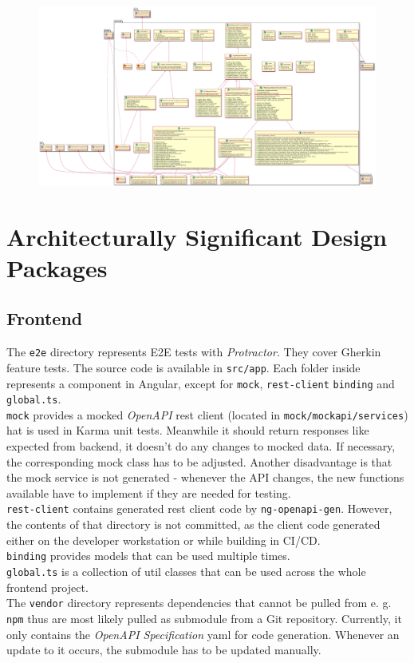 \documentclass[a4paper,12pt,chapterprefix=false,bibliography=totoc,listof=totoc,]{scrreprt}
\begin{document}
\begin{figure}
	\includegraphics[width=\textwidth]{diagramms/BackendOverview.png}
	\label{fig:ucd}
\end{figure}


\section{Architecturally Significant Design Packages}
\subsection{Frontend}
The \texttt{e2e} directory represents E2E tests with \textit{Protractor}. They cover Gherkin feature tests. The source code is available in \texttt{src/app}. Each folder inside represents a component in Angular, except for \texttt{mock}, \texttt{rest-client} \texttt{binding} and \texttt{global.ts}. \\
\texttt{mock} provides a mocked \textit{OpenAPI} \gls{rest} client (located in \texttt{mock/mockapi/services}) hat is used in Karma unit tests. Meanwhile it should return responses like expected from backend, it doesn't do any changes to mocked data. If necessary, the corresponding mock class has to be adjusted. Another disadvantage is that the mock service is not generated - whenever the API changes, the new functions available have to implement if they are needed for testing. \\
\texttt{rest-client} contains generated \gls{rest} client code by \texttt{ng-openapi-gen}. However, the contents of that directory is not committed, as the client code generated either on the developer workstation or while building in CI/CD. \\
\texttt{binding} provides models that can be used multiple times. \\
\texttt{global.ts} is a collection of util classes that can be used across the whole frontend project. \\
The \texttt{vendor} directory represents dependencies that cannot be pulled from e. g. \texttt{npm} thus are most likely pulled as submodule from a Git repository. Currently, it only contains the \textit{OpenAPI Specification} \gls{yaml} for code generation. Whenever an update to it occurs, the submodule has to be updated manually.
\end{document}
